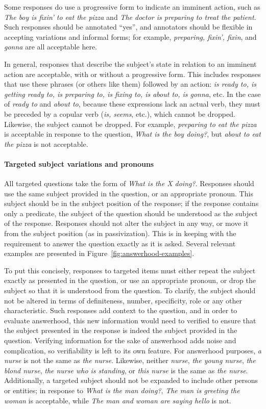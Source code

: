 \documentclass[12pt,notitlepage]{article}
\begin{document}
Some responses do use a progressive form to indicate an imminent action, such as \textit{The boy is fixin' to eat the pizza} and \textit{The doctor is preparing to treat the patient}. Such responses should be annotated ``yes'', and annotators should be flexible in accepting variations and informal forms; for example, \textit{preparing, fixin', fixin}, and \textit{gonna} are all acceptable here.

In general, responses that describe the subject's state in relation to an imminent action are acceptable, with or without a progressive form. This includes responses that use these phrases (or others like them) followed by an action: \textit{is ready to, is getting ready to, is preparing to, is fixing to, is about to, is gonna}, etc. In the case of \textit{ready to} and \textit{about to}, because these expressions lack an actual verb, they must be preceded by a copular verb (\textit{is, seems}, etc.), which cannot be dropped. Likewise, the subject cannot be dropped. For example, \textit{preparing to eat the pizza} is acceptable in response to the question, \textit{What is the boy doing?}, but \textit{about to eat the pizza} is not acceptable.


\paragraph{Targeted subject variations and pronouns}
All targeted questions take the form of \textit{What is the X doing?}. Responses should use the same subject provided in the question, or an appropriate pronoun. This subject should be in the subject position of the response; if the response contains only a predicate, the subject of the question should be understood as the subject of the response. Responses should not alter the subject in any way, or move it from the subject position (as in passivization). This is in keeping with the requirement to answer the question exactly as it is asked. Several relevant examples are presented in Figure~\ref{fig:answerhood-examples}.

To put this concisely, responses to targeted items must either repeat the subject exactly as presented in the question, or use an appropriate pronoun, or drop the subject so that it is understood from the question. To clarify, the subject should not be altered in terms of definiteness, number, specificity, role or any other characteristic. Such responses add context to the question, and in order to evaluate answerhood, this new information would need to verified to ensure that the subject presented in the response is indeed the subject provided in the question. Verifying information for the sake of answerhood adds noise and complication, so verifiability is left to its own feature. For answerhood purposes, \textit{a nurse} is not the same as \textit{the nurse}. Likewise, neither \textit{nurse}, \textit{the young nurse}, \textit{the blond nurse}, \textit{the nurse who is standing}, or \textit{this nurse} is the same as \textit{the nurse}. Additionally, a targeted subject should not be expanded to include other persons or entities; in response to \textit{What is the man doing?}, \textit{The man is greeting the woman} is acceptable, while \textit{The man and woman are saying hello} is not.
\end{document}

